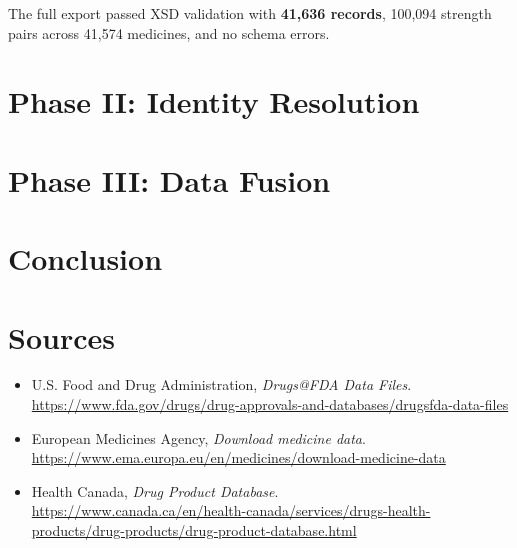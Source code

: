 \documentclass[a4paper,oneside,bibliography=totoc]{scrbook}
\begin{document}
The full export passed XSD validation with \textbf{41,636 records},
100,094 strength pairs across 41,574 medicines, and no schema errors.




\section{Phase II: Identity Resolution}




\section{Phase III: Data Fusion}




\section{Conclusion}





\section*{Sources}

\begin{itemize}
    \item U.S. Food and Drug Administration,
    \emph{Drugs@FDA Data Files}.\\
    \url{https://www.fda.gov/drugs/drug-approvals-and-databases/drugsfda-data-files}

    \item European Medicines Agency,
    \emph{Download medicine data}.\\
    \url{https://www.ema.europa.eu/en/medicines/download-medicine-data}

    \item Health Canada,
    \emph{Drug Product Database}.\\
    \url{https://www.canada.ca/en/health-canada/services/drugs-health-products/drug-products/drug-product-database.html}
\end{itemize}
\end{document}
